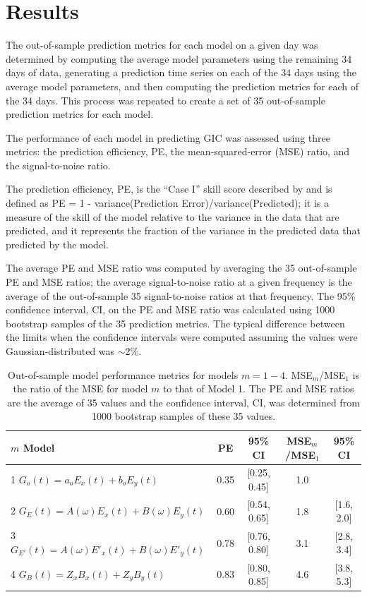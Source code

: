 \documentclass[draft,linenumbers]{agujournal2018}
\begin{document}
\section{Results}

The out-of-sample prediction metrics for each model on a given day was determined by computing the average model parameters using the remaining 34 days of data, generating a prediction time series on each of the 34 days using the average model parameters, and then computing the prediction metrics for each of the 34 days. This process was repeated to create a set of 35 out-of-sample prediction metrics for each model.

The performance of each model in predicting GIC was assessed using three metrics: the prediction efficiency, PE, the mean-squared-error (MSE) ratio, and the signal-to-noise ratio. 

The prediction efficiency, PE, is the ``Case I'' skill score described by \cite{Murphy1988} and is defined as PE = 1 - variance(Prediction Error)/variance(Predicted); it is a measure of the skill of the model relative to the variance in the data that are predicted, and it represents the fraction of the variance in the predicted data that predicted by the model.

The average PE and MSE ratio was computed by averaging the 35 out-of-sample PE and MSE ratios; the average signal-to-noise ratio at a given frequency is the average of the out-of-sample 35 signal-to-noise ratios at that frequency. The 95\% confidence interval, CI, on the PE and MSE ratio was calculated using 1000 bootstrap samples of the 35 prediction metrics. The typical difference between the limits when the confidence intervals were computed assuming the values were Gaussian-distributed was $\sim$2\%.

\begin{table}
\caption{Out-of-sample model performance metrics for models $m=1-4$. MSE$_m$/MSE$_1$ is the ratio of the MSE for model $m$ to that of Model 1. The PE and MSE ratios are the average of 35 values and the confidence interval, CI, was determined from 1000 bootstrap samples of these 35 values.}
\centering
\begin{tabular}{l c c c c}
\hline
$m$\hspace{1em} Model & PE & 95\% CI & MSE$_m$/MSE$_1$ & 95\% CI\\
\hline
1\hspace{1em} $G_o(t) = a_oE_x(t) + b_oE_y(t)$ & 0.35 & [0.25, 0.45] & 1.0 & \\
2\hspace{1em} $G_E(t) = A(\omega)E_x(t) + B(\omega)E_y(t)$ & 0.60 & [0.54, 0.65] & 1.8 & [1.6, 2.0]\\
3\hspace{1em} $G_{E'}(t) = A(\omega)E'_x(t) + B(\omega)E'_y(t)$ & 0.78 & [0.76, 0.80] & 3.1 & [2.8, 3.4]\\
4\hspace{1em} $G_{B}(t) = Z_xB_x(t) + Z_yB_y(t)$ & 0.83 & [0.80, 0.85] & 4.6 & [3.8, 5.3]\\
\hline
\end{tabular}
\end{table}
\end{document}
